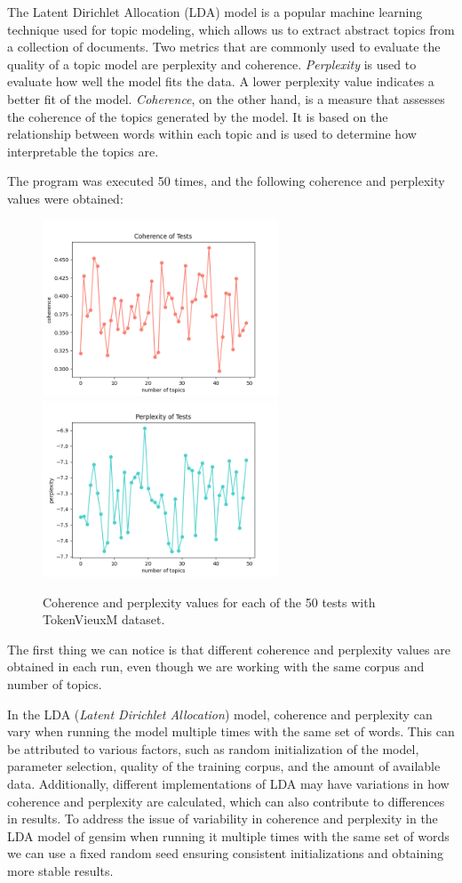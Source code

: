 \documentclass[10pt]{article} %
\begin{document}
	The Latent Dirichlet Allocation (LDA) model is a popular machine learning technique used for topic modeling, which allows us to extract abstract topics from a collection of documents. Two metrics that are commonly used to evaluate the quality of a topic model are perplexity and coherence.
	\textit{Perplexity} is used to evaluate how well the model fits the data. A lower perplexity value indicates a better fit of the model. \textit{Coherence}, on the other hand, is a measure that assesses the coherence of the topics generated by the model. It is based on the relationship between words within each topic and is used to determine how interpretable the topics are. 
	
	The program was executed 50 times, and the following coherence and perplexity values were obtained:
	
	\begin{figure}[H]
		\centering
		\includegraphics[width=7cm]{images/coherence_stopwords}
		\includegraphics[width=7cm]{images/perplexity_stopwords}
	\caption{Coherence and perplexity values for each of the 50 tests with TokenVieuxM dataset.}
		\end{figure}
	
	The first thing we can notice is that different coherence and perplexity values are obtained in each run, even though we are working with the same corpus and number of topics. 
		
	In the LDA (\textit{Latent Dirichlet Allocation}) model, coherence and perplexity can vary when running the model multiple times with the same set of words. This can be attributed to various factors, such as random initialization of the model, parameter selection, quality of the training corpus, and the amount of available data. Additionally, different implementations of LDA may have variations in how coherence and perplexity are calculated, which can also contribute to differences in results. To address the issue of variability in coherence and perplexity in the LDA model of gensim when running it multiple times with the same set of words we can use a fixed random seed ensuring consistent initializations and obtaining more stable results. 
	
\end{document}
